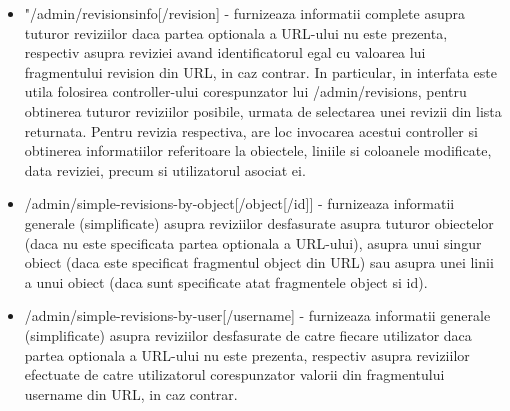 \begin{itemize}
\item{"/admin/revisionsinfo[/{revision}] - furnizeaza informatii complete asupra tuturor reviziilor daca partea optionala a URL-ului nu este prezenta, respectiv asupra reviziei avand identificatorul egal cu valoarea lui fragmentului revision din URL, in caz contrar. In particular, in interfata este utila folosirea controller-ului corespunzator lui /admin/revisions, pentru obtinerea tuturor reviziilor posibile, urmata de selectarea unei revizii din lista returnata. Pentru revizia respectiva, are loc invocarea acestui controller si obtinerea informatiilor referitoare la obiectele, liniile si coloanele modificate, data reviziei, precum si utilizatorul asociat ei.}
\item{/admin/simple-revisions-by-object[/{object}[/{id}]] - furnizeaza informatii generale (simplificate) asupra reviziilor desfasurate asupra tuturor obiectelor (daca nu este specificata partea optionala a URL-ului), asupra unui singur obiect (daca este specificat fragmentul object din URL) sau asupra unei linii a unui obiect (daca sunt specificate atat fragmentele object si id).}
\item{/admin/simple-revisions-by-user[/{username}] - furnizeaza informatii generale (simplificate) asupra reviziilor desfasurate de catre fiecare utilizator daca partea optionala a URL-ului nu este prezenta, respectiv asupra reviziilor efectuate de catre utilizatorul corespunzator valorii din fragmentului username din URL, in caz contrar.}
\end{itemize}




